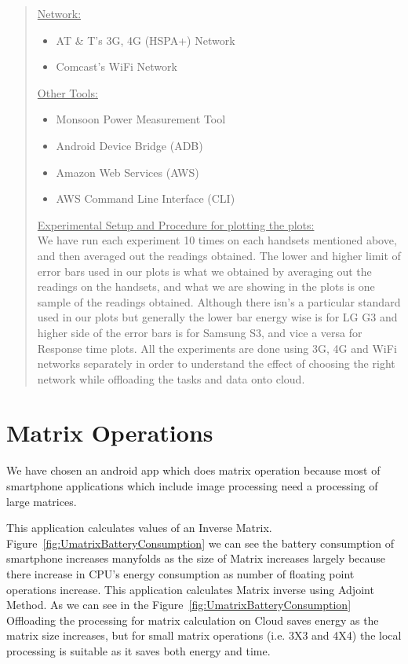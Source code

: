 \documentclass{report}
\begin{document}
\begin{abstract}
\begin{itemize}
\end{itemize}

\underline{Network:}
\begin{itemize}
\item AT \& T's 3G, 4G (HSPA+) Network
\item Comcast's WiFi Network
\end{itemize}

\underline{Other Tools:}
\begin{itemize}
\item Monsoon Power Measurement Tool
\item Android Device Bridge (ADB)
\item Amazon Web Services (AWS)
\item AWS Command Line Interface (CLI)
\end{itemize}

\underline{Experimental Setup and Procedure for plotting the plots:}\\


We have run each experiment 10 times on each handsets mentioned above, and then averaged out the readings obtained. The lower and higher limit of error bars used in our plots is what we obtained by averaging out the readings on the handsets, and what we are showing in the plots is one sample of the readings obtained. Although there isn's a particular standard used in our plots but generally the lower bar energy wise is for LG G3 and higher side of the error bars is for Samsung S3, and vice a versa for Response time plots. All the experiments are done using 3G, 4G and WiFi networks separately in order to understand the effect of choosing the right network while offloading the tasks and data onto cloud.
\end{abstract}

\chapter{Matrix Operations}
We have chosen an android app which does matrix operation because most of smartphone applications which include image processing  need a processing of large matrices.

This application calculates values of an Inverse Matrix. Figure~\ref{fig:UmatrixBatteryConsumption} we can see the battery consumption
of smartphone increases manyfolds as the size of Matrix increases largely because there increase in CPU's energy consumption as number of floating point operations increase. This application calculates Matrix inverse using Adjoint Method. As we can see in the Figure~\ref{fig:UmatrixBatteryConsumption} Offloading the processing for matrix calculation on Cloud saves energy as the matrix size increases, but for small matrix operations (i.e. 3X3 and 4X4) the local processing is suitable as it saves both energy and time.
\end{document}
